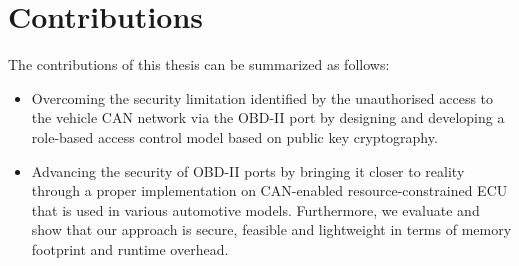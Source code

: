 \section{Contributions}
\label{sec:contributions}

The contributions of this thesis can be summarized as follows:

\begin{itemize}
	\item Overcoming the security limitation identified by the unauthorised access to the vehicle CAN network via the OBD-II port by designing and developing a role-based access control model based on public key cryptography.
	
	\item Advancing the security of OBD-II ports by bringing it closer to reality through a proper implementation on CAN-enabled resource-constrained ECU that is used in various automotive models. Furthermore, we evaluate and show that our approach is secure, feasible and lightweight in terms of memory footprint and runtime overhead.
\end{itemize} 

